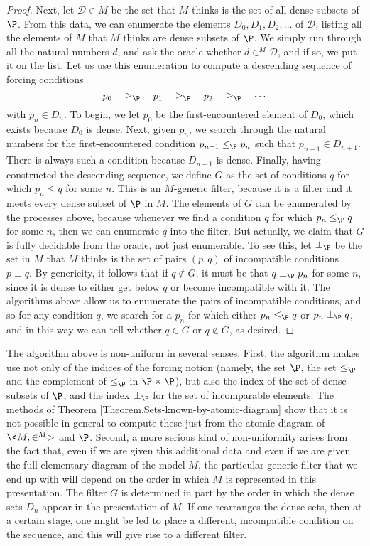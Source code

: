 \documentclass{amsart}
\begin{document}
\begin{proof}
Next, let $\mathcal{D}\in M$ be the set that $M$ thinks is the set of all dense subsets of $\P$. From this data, we can enumerate the elements $D_0,D_1,D_2,\ldots$ of $\mathcal{D}$, listing all the elements of $M$ that $M$ thinks are dense subsets of $\P$. We simply run through all the natural numbers $d$, and ask the oracle whether $d\in^M \mathcal{D}$, and if so, we put it on the list.
Let us use this enumeration to compute a descending sequence of forcing conditions
$$p_0\quad\geq_\P\quad p_1\quad\geq_\P\quad p_2\quad\geq_\P\quad\cdots$$
with $p_n\in D_n$. To begin, we let $p_0$ be the first-encountered element of $D_0$, which exists because $D_0$ is dense. Next, given $p_n$, we search through the natural numbers for the first-encountered condition $p_{n+1}\leq_\P p_n$ such that $p_{n+1}\in D_{n+1}$. There is always such a condition because $D_{n+1}$ is dense.
Finally, having constructed the descending sequence, we define $G$ as the set of conditions $q$ for which $p_n\leq q$ for some $n$. This is an $M$-generic filter, because it is a filter and it meets every dense subset of $\P$ in $M$. The elements of $G$ can be enumerated by the processes above, because whenever we find a condition $q$ for which $p_n\leq_\P q$ for some $n$, then we can enumerate $q$ into the filter.
But actually, we claim that $G$ is fully decidable from the oracle, not just enumerable. To see this, let $\perp_\P$ be the set in $M$ that $M$ thinks is the set of pairs $(p,q)$ of incompatible conditions $p\perp q$. By genericity, it follows that if $q\notin G$, it must be that $q\perp_\P p_n$ for some $n$, since it is dense to either get below $q$ or become incompatible with it. The algorithms above allow us to enumerate the pairs of incompatible conditions, and so for any condition $q$, we search for a $p_n$ for which either $p_n\leq_\P q$ or $p_n\perp_\P q$, and in this way we can tell whether $q\in G$ or $q\notin G$, as desired.
\end{proof}
The algorithm above is non-uniform in several senses. First, the algorithm makes use not only of the indices
of the forcing notion (namely, the set $\P$, the set $\leq_{\P}$ and the complement of $\leq_{\P}$ in $\P\times\P$),
but also the index of the set of dense subsets of $\P$, and the index $\perp_\P$ for the set of incomparable elements. The methods of Theorem \ref{Theorem.Sets-known-by-atomic-diagram} show that it is not possible in general to compute these just from the atomic diagram of $\<M,\in^M>$ and $\P$. Second, a more serious kind of non-uniformity arises from the fact that, even if we are given this additional data and even if we are given the full elementary diagram of the model $M$, the particular generic filter that we end up with will depend on the order in which $M$ is represented in this presentation. The filter $G$ is determined in part by the order in which the dense sets $D_n$ appear in the presentation of $M$. If one rearranges the dense sets, then at a certain stage, one might be led to place a different, incompatible condition on the sequence, and this will give rise to a different filter.
\end{document}
